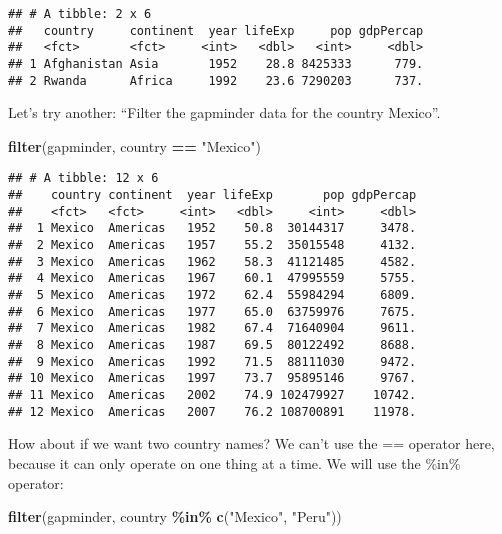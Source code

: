 \documentclass[
]{article}
\newenvironment{Shaded}{\begin{snugshade}}{\end{snugshade}}
\newcommand{\FunctionTok}[1]{\textcolor[rgb]{0.13,0.29,0.53}{\textbf{#1}}}
\newcommand{\NormalTok}[1]{#1}
\newcommand{\SpecialCharTok}[1]{\textcolor[rgb]{0.81,0.36,0.00}{\textbf{#1}}}
\newcommand{\StringTok}[1]{\textcolor[rgb]{0.31,0.60,0.02}{#1}}
\begin{document}
\begin{verbatim}
## # A tibble: 2 x 6
##   country     continent  year lifeExp     pop gdpPercap
##   <fct>       <fct>     <int>   <dbl>   <int>     <dbl>
## 1 Afghanistan Asia       1952    28.8 8425333      779.
## 2 Rwanda      Africa     1992    23.6 7290203      737.
\end{verbatim}

Let's try another: ``Filter the gapminder data for the country Mexico''.

\begin{Shaded}
\begin{Highlighting}[]
\FunctionTok{filter}\NormalTok{(gapminder, country }\SpecialCharTok{==} \StringTok{"Mexico"}\NormalTok{)}
\end{Highlighting}
\end{Shaded}

\begin{verbatim}
## # A tibble: 12 x 6
##    country continent  year lifeExp       pop gdpPercap
##    <fct>   <fct>     <int>   <dbl>     <int>     <dbl>
##  1 Mexico  Americas   1952    50.8  30144317     3478.
##  2 Mexico  Americas   1957    55.2  35015548     4132.
##  3 Mexico  Americas   1962    58.3  41121485     4582.
##  4 Mexico  Americas   1967    60.1  47995559     5755.
##  5 Mexico  Americas   1972    62.4  55984294     6809.
##  6 Mexico  Americas   1977    65.0  63759976     7675.
##  7 Mexico  Americas   1982    67.4  71640904     9611.
##  8 Mexico  Americas   1987    69.5  80122492     8688.
##  9 Mexico  Americas   1992    71.5  88111030     9472.
## 10 Mexico  Americas   1997    73.7  95895146     9767.
## 11 Mexico  Americas   2002    74.9 102479927    10742.
## 12 Mexico  Americas   2007    76.2 108700891    11978.
\end{verbatim}

How about if we want two country names? We can't use the == operator
here, because it can only operate on one thing at a time. We will use
the \%in\% operator:

\begin{Shaded}
\begin{Highlighting}[]
\FunctionTok{filter}\NormalTok{(gapminder, country }\SpecialCharTok{\%in\%} \FunctionTok{c}\NormalTok{(}\StringTok{"Mexico"}\NormalTok{, }\StringTok{"Peru"}\NormalTok{))}
\end{Highlighting}
\end{Shaded}
\end{document}
